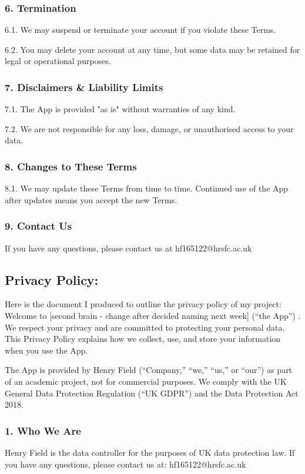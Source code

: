 \subsubsection*{6. Termination}
6.1. We may suspend or terminate your account if you violate these Terms.

6.2. You may delete your account at any time, but some data may be retained for legal or operational purposes.

\subsubsection*{7. Disclaimers \& Liability Limits}
7.1. The App is provided "as is" without warranties of any kind.

7.2. We are not responsible for any loss, damage, or unauthorised access to your data.
\subsubsection*{8. Changes to These Terms}
8.1. We may update these Terms from time to time. Continued use of the App after updates means you accept the new Terms.
\subsubsection*{9. Contact Us}
If you have any questions, please contact us at hf165122@hrsfc.ac.uk

\subsection*{Privacy Policy:}
Here is the document I produced to outline the privacy policy of my project:
Welcome to [second brain - change after decided naming next week] (“the App”) . 
We respect your privacy and are committed to protecting your personal data. This Privacy Policy explains how we collect, use, and store your information when you use the App. 

The App is provided by Henry Field (“Company,” “we,” “us,” or “our”) as part of an academic project, not for commercial purposes. We comply with the UK General Data Protection Regulation (“UK GDPR”) and the Data Protection Act 2018.

\subsubsection*{1. Who We Are}
Henry Field is the data controller for the purposes of UK data protection law. If you have any questions, please contact us at: hf165122@hrsfc.ac.uk
